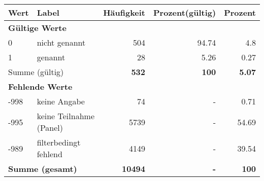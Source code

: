      \begin{longtable}{lXrrr}
     \toprule
     \textbf{Wert} & \textbf{Label} & \textbf{Häufigkeit} & \textbf{Prozent(gültig)} & \textbf{Prozent} \\
     \endhead
     \midrule
     \multicolumn{5}{l}{\textbf{Gültige Werte}}\\

     0 &
     \multicolumn{1}{X}{ nicht genannt   } &


       \num{504} &
       \num[round-mode=places,round-precision=2]{94,74} &
         \num[round-mode=places,round-precision=2]{4,8} \\

     1 &
     \multicolumn{1}{X}{ genannt   } &


       \num{28} &
       \num[round-mode=places,round-precision=2]{5,26} &
         \num[round-mode=places,round-precision=2]{0,27} \\
     \midrule
     \multicolumn{2}{l}{Summe (gültig)} &
       \textbf{\num{532}} &
     \textbf{100} &
       \textbf{\num[round-mode=places,round-precision=2]{5,07}} \\
     \multicolumn{5}{l}{\textbf{Fehlende Werte}}\\
       -998 &
       keine Angabe &
         \num{74} &
        - &
         \num[round-mode=places,round-precision=2]{0,71} \\
       -995 &
       keine Teilnahme (Panel) &
         \num{5739} &
        - &
         \num[round-mode=places,round-precision=2]{54,69} \\
       -989 &
       filterbedingt fehlend &
         \num{4149} &
        - &
         \num[round-mode=places,round-precision=2]{39,54} \\
     \midrule
     \multicolumn{2}{l}{\textbf{Summe (gesamt)}} &
          \textbf{\num{10494}} &
        \textbf{-} &
        \textbf{100} \\
     \bottomrule
     \end{longtable}
     
